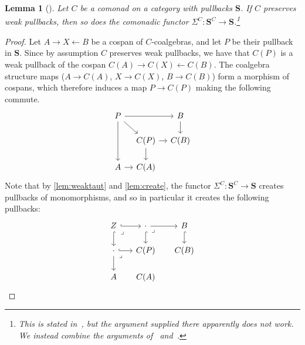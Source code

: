 \documentclass[11pt, oneside, article]{memoir}
\theoremstyle{plain}
\newtheorem{lemma}[theorem]{Lemma}
\theoremstyle{definition}
\theoremstyle{remark}
\newcommand{\ot}{\leftarrow}
\newcommand{\cat}[1]{\mathbf{#1}}
\newcommand{\CoalgOn}[2]{{#2}^{#1}}
\newcommand{\CoalgS}[1]{\CoalgOn{#1}{\bS}}
\newcommand{\carr}{\Sigma}
\newcommand{\car}[1]{\carr^{#1}}
\newcommand{\carC}{\car{\cC}}
\newcommand{\cmnd}[1]{{#1}}
\newcommand{\cC}{\cmnd{C}}
\newcommand{\bS}{\cat{S}}
\newcommand{\CS}{\CoalgS{\cC}}
\begin{document}
\begin{lemma}[{\cite{johnstone-power-tsujishita-watanabe-worrell}}]\label{lem:weakpreserve}
  Let $\cC$ be a comonad on a category with pullbacks $\bS$. If $\cC$
  preserves weak pullbacks, then so does the comonadic functor
  $\carC \colon \CS \to \bS$.\footnote{This is stated in~\cite[Remark
    2.9]{johnstone-power-tsujishita-watanabe-worrell}, but the argument
    supplied there apparently does not work. We instead combine the
    arguments of~\cite[Lemma
    2.8]{johnstone-power-tsujishita-watanabe-worrell}
    and~\cite[Proposition
    3.4]{johnstone-power-tsujishita-watanabe-worrell}.}
\end{lemma}
\begin{proof}
  Let $A \to X \ot B$ be a cospan of $\cC$-coalgebras, and let $P$ be
  their pullback in $\bS$. Since by assumption $\cC$ preserves weak
  pullbacks, we have that $\cC(P)$ is a weak pullback of the cospan
  $\cC(A) \to \cC(X) \ot \cC(B)$. The coalgebra structure maps
  ($A \to \cC(A)$, $X \to \cC(X)$, $B \to \cC(B)$) form a morphism of
  cospans, which therefore induces a map $P \to \cC(P)$ making the
  following commute.
  \[\begin{tikzcd}[row sep=15, column sep=10]
      P && B \\
      & {\cC(P)} & {\cC(B)} \\
      A & {\cC(A)}
      \arrow[from=1-1, to=1-3]
      \arrow[from=1-1, to=2-2]
      \arrow[from=1-1, to=3-1]
      \arrow[from=1-3, to=2-3]
      \arrow[from=2-2, to=2-3]
      \arrow[from=2-2, to=3-2]
      \arrow[from=3-1, to=3-2]
    \end{tikzcd}\]
  Note that by \cref{lem:weaktaut} and \cref{lem:create}, the functor
  $\carC \colon \CS \to \bS$ creates pullbacks of monomorphisms, and
  so in particular it creates the following pullbacks:
  \[
    \begin{tikzcd}[row sep=15, column sep=15]
      Z & \cdot & B \\
      \cdot & {\cC(P)} & {\cC(B)} \\
      A & {\cC(A)}
      \arrow[hook, from=1-1, to=1-2]
      \arrow[hook, from=1-1, to=2-1]
      \arrow["\lrcorner"{anchor=center, pos=0.125}, draw=none, from=1-1, to=2-2]
      \arrow[from=1-2, to=1-3]
      \arrow[hook, from=1-2, to=2-2]
      \arrow["\lrcorner"{anchor=center, pos=0.125}, draw=none, from=1-2, to=2-3]
      \arrow[hook, from=1-3, to=2-3]
      \arrow[hook, from=2-1, to=2-2]
      \arrow[from=2-1, to=3-1]
      \arrow["\lrcorner"{anchor=center, pos=0.125}, draw=none, from=2-1, to=3-2]

\end{tikzcd}\]
\end{proof}
\end{document}
